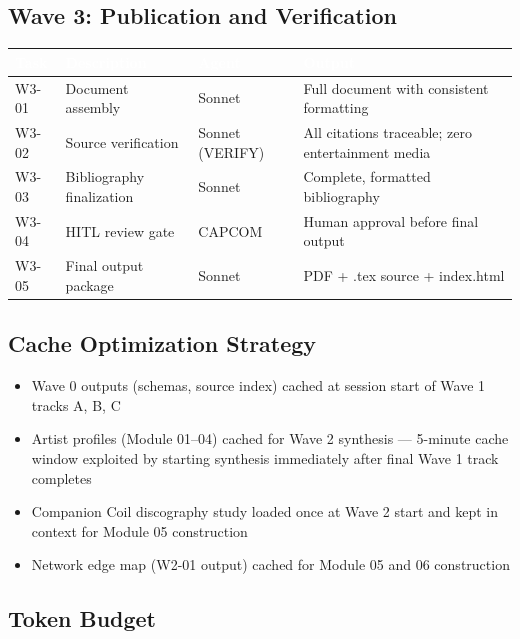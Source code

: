 \documentclass[11pt,letterpaper]{article}
\newcommand{\tableheader}[1]{\textbf{\sffamily\textcolor{white}{#1}}}
\begin{document}
\subsection{Wave 3: Publication and Verification}

\begin{center}
\begin{tabularx}{\textwidth}{L{1.5cm}L{3.5cm}L{2.5cm}X}
\toprule
{}
\tableheader{Task} & \tableheader{Description} & \tableheader{Agent} & \tableheader{Output} \\
\midrule
W3-01 & Document assembly & Sonnet & Full document with consistent formatting \\
W3-02 & Source verification & Sonnet (VERIFY) & All citations traceable; zero entertainment media \\
W3-03 & Bibliography finalization & Sonnet & Complete, formatted bibliography \\
W3-04 & HITL review gate & CAPCOM & Human approval before final output \\
W3-05 & Final output package & Sonnet & PDF + .tex source + index.html \\
\bottomrule
\end{tabularx}
\end{center}

\subsection{Cache Optimization Strategy}

\begin{itemize}[noitemsep]
  \item Wave 0 outputs (schemas, source index) cached at session start of Wave 1 tracks A, B, C
  \item Artist profiles (Module 01--04) cached for Wave 2 synthesis — 5-minute cache window exploited by starting synthesis immediately after final Wave 1 track completes
  \item Companion Coil discography study loaded once at Wave 2 start and kept in context for Module 05 construction
  \item Network edge map (W2-01 output) cached for Module 05 and 06 construction
\end{itemize}

\subsection{Token Budget}
\end{document}
